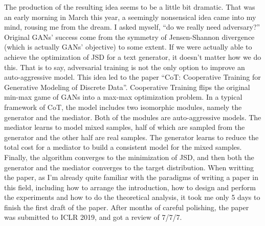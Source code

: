 \documentclass{article}
\begin{document}
      The production of the resulting idea seems to be a little bit dramatic. That was an early morning in March this year, a seemingly nonsensical idea came into my mind, rousing me from the dream. I asked myself, ``do we really need adversary?'' Original GANs' success come from the symmetry of Jensen-Shannon divergence (which is actually GANs' objective) to some extent. If we were actually able to achieve the optimization of JSD for a text generator, it doesn't matter how we do this. That is to say, adversarial training is not the only option to improve an auto-aggressive model. This idea led to the paper ``CoT: Cooperative Training for Generative Modeling of Discrete Data''. Cooperative Training flips the original min-max game of GANs into a max-max optimization problem. In a typical framework of CoT, the model includes two isomorphic modules, namely the generator and the mediator. Both of the modules are auto-aggressive models. The mediator learns to model mixed samples, half of which are sampled from the generator and the other half are real samples. The generator learns to reduce the total cost for a mediator to build a consistent model for the mixed samples. Finally, the algorithm converges to the minimization of JSD, and then both the generator and the mediator converges to the target distribution. When writting the paper, as I'm already quite familiar with the paradigms of writing a paper in this field, including how to arrange the introduction, how to design and perform the experiments and how to do the theoretical analysis, it took me only 5 days to finish the first draft of the paper. After months of careful polishing, the paper was submitted to ICLR 2019, and got a review of 7/7/7. 
\end{document}
